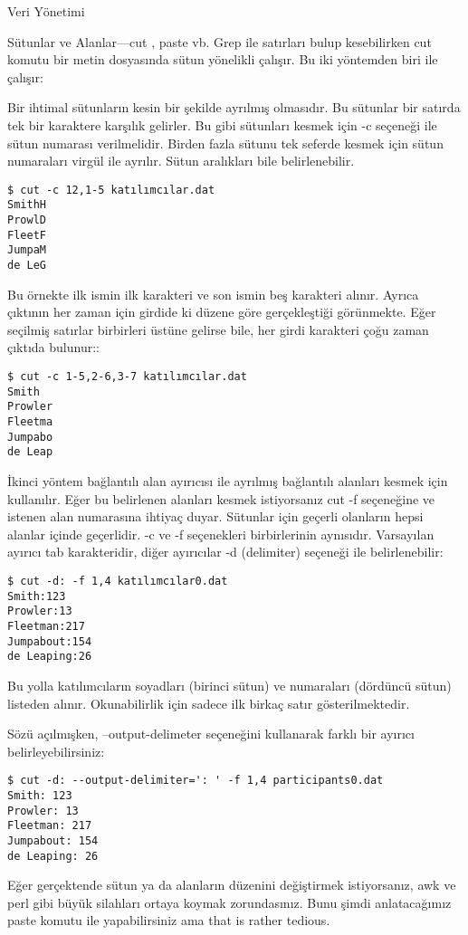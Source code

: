 \begin{section}{Veri Yönetimi}
\begin{subsection}{Sütunlar ve Alanlar—cut , paste vb.}
Grep ile satırları bulup kesebilirken cut komutu bir metin dosyasında sütun yönelikli çalışır. Bu iki yöntemden biri ile çalışır:

Bir ihtimal sütunların kesin bir şekilde ayrılmış olmasıdır. Bu sütunlar bir satırda tek bir karaktere karşılık gelirler. Bu gibi sütunları kesmek için -c seçeneği ile sütun numarası verilmelidir. Birden fazla sütunu tek seferde kesmek için sütun numaraları virgül ile ayrılır. Sütun aralıkları bile belirlenebilir.
\begin{verbatim}
$ cut -c 12,1-5 katılımcılar.dat 
SmithH 
ProwlD 
FleetF 
JumpaM 
de LeG 
\end{verbatim}

Bu örnekte ilk ismin ilk karakteri ve son ismin beş karakteri alınır. Ayrıca çıktının her zaman için girdide ki düzene göre gerçekleştiği görünmekte. Eğer seçilmiş satırlar birbirleri üstüne gelirse bile, her girdi karakteri çoğu zaman çıktıda bulunur:: 
\begin{verbatim}
$ cut -c 1-5,2-6,3-7 katılımcılar.dat 
Smith 
Prowler 
Fleetma 
Jumpabo 
de Leap
\end{verbatim}

İkinci yöntem bağlantılı alan ayırıcısı ile ayrılmış bağlantılı alanları kesmek için kullanılır. Eğer bu belirlenen alanları kesmek istiyorsanız cut -f seçeneğine ve istenen alan numarasına ihtiyaç duyar. Sütunlar için geçerli olanların hepsi alanlar içinde geçerlidir. -c ve -f  seçenekleri birbirlerinin aynısıdır.
Varsayılan ayırıcı tab karakteridir, diğer ayırıcılar -d (delimiter) seçeneği ile belirlenebilir:
\begin{verbatim}
$ cut -d: -f 1,4 katılımcılar0.dat 
Smith:123 
Prowler:13 
Fleetman:217 
Jumpabout:154 
de Leaping:26
\end{verbatim}

Bu yolla katılımcıların soyadları (birinci sütun) ve numaraları (dördüncü sütun) listeden alınır. Okunabilirlik için sadece ilk birkaç satır gösterilmektedir.

Sözü açılmışken, --output-delimeter seçeneğini kullanarak farklı bir ayırıcı belirleyebilirsiniz:
\begin{verbatim}
$ cut -d: --output-delimiter=': ' -f 1,4 participants0.dat
Smith: 123
Prowler: 13
Fleetman: 217
Jumpabout: 154
de Leaping: 26
\end{verbatim}

Eğer gerçektende sütun ya da alanların düzenini değiştirmek istiyorsanız, awk ve perl gibi büyük silahları ortaya koymak zorundasınız. Bunu şimdi anlatacağımız paste komutu ile yapabilirsiniz ama that is rather tedious. 


\end{subsection}
\end{section}
